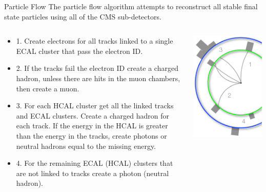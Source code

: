 \begin{frame}{Particle Flow}
The particle flow algorithm attempts to reconstruct all stable final state particles using all of the CMS sub-detectors.

\begin{columns}[T]
  \begin{column}{0.6\textwidth}
\footnotesize
    \begin{itemize}
    \item
      1. Create electrons for all tracks linked to a single ECAL cluster that pass the electron ID.
    \item
      2. If the tracks fail the electron ID create a charged hadron, unless there are hits in the muon chambers, then create a muon.
    \item
      3. For each HCAL cluster get all the linked tracks and ECAL clusters. Create a charged hadron for each track. If the energy in the HCAL is greater than the energy in the tracks, create photons or neutral hadrons equal to the missing energy.
    \item
      4. For the remaining ECAL (HCAL) clusters that are not linked to tracks create a photon (neutral hadron).
    \end{itemize}
  \end{column}
  \begin{column}{0.40\textwidth}
    \includegraphics[width=0.99\textwidth]{images/pf4.pdf}

\end{column}
\end{columns}
\end{frame}
